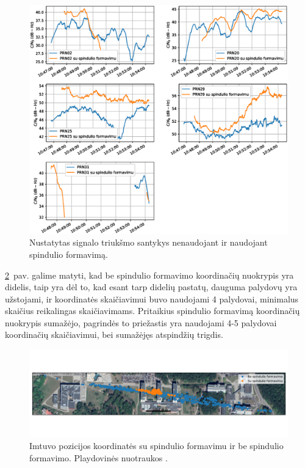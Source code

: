 \documentclass[main.tex]{subfiles}
\begin{document}
\begin{figure}[ht]
    \begin{centering}
    \includegraphics[scale=0.6]{drawings/two_reflections_snr}
    \par\end{centering}
    \protect\caption{\label{fig:two_reflection_snr}Nustatytas signalo triukšmo santykys nenaudojant ir naudojant spindulio formavimą.}
\end{figure}

\ref{fig:two_reflection_map}~pav. galime matyti, kad be spindulio formavimo koordinačių
nuokrypis yra didelis, taip yra dėl to, kad esant tarp didelių pastatų, dauguma palydovų
yra užstojami, ir koordinatės skaičiavimui buvo naudojami 4 palydovai, minimalus
skaičius reikalingas skaičiavimams. Pritaikius spindulio formavimą koordinačių
nuokrypis sumažėjo, pagrindės to priežastis yra naudojami 4-5 palydovai koordinačių
skaičiavimui, bei sumažėjęs atspindžių trigdis.

\begin{figure}[ht]
    \begin{centering}
    \includegraphics[scale=0.5]{drawings/two_reflections_map}
    \par\end{centering}
    \protect\caption{\label{fig:two_reflection_map}Imtuvo pozicijos koordinatės su spindulio formavimu ir be spindulio formavimo. Playdovinės nuotraukos \cite{google_maps}.}
\end{figure}
\end{document}
